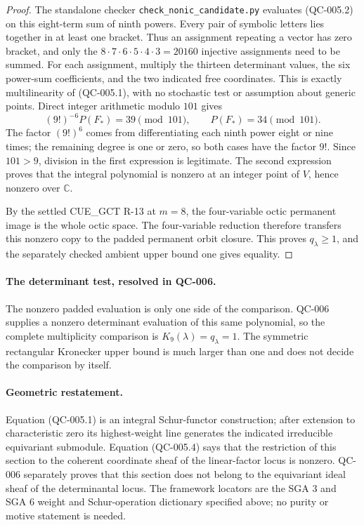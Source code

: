 \begin{proof}
The standalone checker \texttt{check\_nonic\_candidate.py}
evaluates (QC-005.2) on this eight-term sum of ninth powers.
Every pair of symbolic letters lies together in at least one
bracket. Thus an assignment repeating a vector has zero bracket,
and only the $8\cdot7\cdot6\cdot5\cdot4\cdot3=20160$
injective assignments need to be summed. For each assignment,
multiply the thirteen determinant values, the six power-sum
coefficients, and the two indicated free coordinates. This is
exactly multilinearity of (QC-005.1), with no stochastic test or
assumption about generic points. Direct integer arithmetic modulo
$101$ gives
\[
 (9!)^{-6}P(F_*)=39\pmod{101},\qquad
 P(F_*)=34\pmod{101}.
 \tag{QC-005.4}
\]
The factor $(9!)^6$ comes from differentiating each ninth power
eight or nine times; the remaining degree is one or zero, so
both cases have the factor $9!$. Since $101>9$, division in the
first expression is legitimate. The second expression proves
that the integral polynomial is nonzero at an integer point of
$V$, hence nonzero over $\mathbb C$.

By the settled CUE\_GCT R-13 at $m=8$, the four-variable octic
permanent image is the whole octic space. The four-variable
reduction therefore transfers this nonzero copy to the padded
permanent orbit closure. This proves $q_\lambda\geq1$, and the
separately checked ambient upper bound one gives equality.
\end{proof}

\paragraph{The determinant test, resolved in QC-006.}
The nonzero padded evaluation is only one side of the comparison.
QC-006 supplies a nonzero determinant evaluation of this same polynomial,
so the complete multiplicity comparison is $K_9(\lambda)=q_\lambda=1$.
The symmetric rectangular Kronecker upper bound is much larger than one
and does not decide the comparison by itself.

\paragraph{Geometric restatement.}
Equation (QC-005.1) is an integral Schur-functor construction;
after extension to characteristic zero its highest-weight line
generates the indicated irreducible equivariant submodule.
Equation (QC-005.4) says that the restriction of this section to
the coherent coordinate sheaf of the linear-factor locus is
nonzero. QC-006 separately proves that this section does not belong to the
equivariant ideal sheaf of the determinantal locus.
The framework locators are the SGA 3 and SGA 6 weight and
Schur-operation dictionary specified above; no purity or motive
statement is needed.
